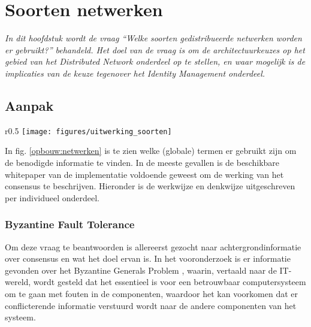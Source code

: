 \section{Soorten netwerken}

\textit{In dit hoofdstuk wordt de vraag ``Welke soorten gedistribueerde netwerken worden er gebruikt?'' behandeld. Het doel van de vraag is om de architectuurkeuzes op het gebied van het Distributed Network onderdeel op te stellen, en waar mogelijk is de implicaties van de keuze tegenover het Identity Management onderdeel.}


\subsection{Aanpak}

\begin{wrapfigure}[14]{r}{0.5\textwidth}
  \texttt{[image: figures/uitwerking\_soorten]}
  \caption[Opbouw beantwoording ``Soorten netwerken'']{Termen die als leidraad gebruikt zijn om het resultaat te beschrijven}
  \label{opbouw:netwerken}
\end{wrapfigure}

In fig. \ref{opbouw:netwerken} is te zien welke (globale) termen er gebruikt zijn om de benodigde informatie te vinden. In de meeste gevallen is de beschikbare whitepaper van de implementatie voldoende geweest om de werking van het consensus te beschrijven. Hieronder is de werkwijze en denkwijze uitgeschreven per individueel onderdeel.

\subsubsection{Byzantine Fault Tolerance}
Om deze vraag te beantwoorden is allereerst gezocht naar achtergrondinformatie over consensus en wat het doel ervan is. In het vooronderzoek is er informatie gevonden over het Byzantine Generals Problem \citep{lamport1982byzantine}, waarin, vertaald naar de IT-wereld, wordt gesteld dat het essentieel is voor een betrouwbaar computersysteem om te gaan met fouten in de componenten, waardoor het kan voorkomen dat er conflicterende informatie verstuurd wordt naar de andere componenten van het systeem. 


